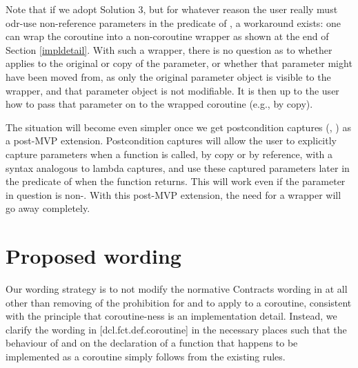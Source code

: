 Note that if we adopt Solution 3, but for whatever reason the user really must odr-use non-reference parameters in the predicate of , a workaround exists: one can wrap the coroutine into a non-coroutine wrapper as shown at the end of Section \ref{impldetail}. With such a wrapper, there is no question as to whether  applies to the original or copy of the parameter, or whether that parameter might have been moved from, as only the original parameter object is visible to the wrapper, and that parameter object is not modifiable. It is then up to the user how to pass that parameter on to the wrapped coroutine (e.g., by copy).

The situation will become even simpler once we get postcondition captures (\cite{P2461R1}, \cite{P3098R0}) as a post-MVP extension. Postcondition captures will allow the user to explicitly capture parameters when a function is called, by copy or by reference, with a syntax analogous to lambda captures, and use these captured parameters later in the predicate of  when the function returns. This will work even if the parameter in question is non-. With this post-MVP extension, the need for a wrapper will go away completely.

\section{Proposed wording}
\label{wording}

Our wording strategy is to not modify the normative Contracts wording in \cite{P2900R8} at all other than removing of the prohibition for  and  to apply to a coroutine, consistent with the principle that coroutine-ness is an implementation detail. Instead, we clarify the wording in [dcl.fct.def.coroutine] in the necessary places such that the behaviour of  and  on the declaration of a function that happens to be implemented as a coroutine simply follows from the existing rules.

